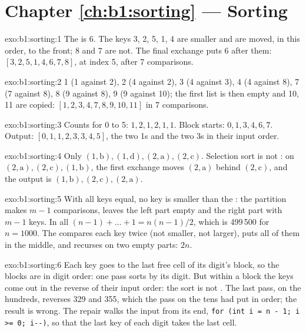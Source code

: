 \section*{Chapter \ref{ch:b1:sorting} --- Sorting}

\begin{solution}{exo:b1:sorting:1}
The  is 6. The keys 3, 2, 5, 1, 4 are smaller and are moved, in this order, to the front; 8 and 7 are not. The
final exchange puts 6 after them: $[3, 2, 5, 1, 4, 6, 7, 8]$,  at index 5, after 7 comparisons.
\end{solution}

\begin{solution}{exo:b1:sorting:2}
1 (1 against 2), 2 (4 against 2), 3 (4 against 3), 4 (4 against 8), 7 (7 against 8), 8 (9 against 8), 9 (9 against 10);
the first list is then empty and 10, 11 are copied: $[1, 2, 3, 4, 7, 8, 9, 10, 11]$ in 7 comparisons.
\end{solution}

\begin{solution}{exo:b1:sorting:3}
Counts for 0 to 5: $1, 2, 1, 2, 1, 1$. Block starts: $0, 1, 3, 4, 6, 7$. Output: $[0, 1, 1, 2, 3, 3, 4, 5]$, the two 1s
and the two 3s in their input order.
\end{solution}

\begin{solution}{exo:b1:sorting:4}
Only $(1, \mathrm{b}), (1, \mathrm{d}), (2, \mathrm{a}), (2, \mathrm{c})$. Selection sort is not : on $(2,
\mathrm{a}), (2, \mathrm{c}), (1, \mathrm{b})$, the first exchange moves $(2, \mathrm{a})$ behind $(2, \mathrm{c})$, and
the output is $(1, \mathrm{b}), (2, \mathrm{c}), (2, \mathrm{a})$.
\end{solution}

\begin{solution}{exo:b1:sorting:5}
With all keys equal, no key is smaller than the : the partition makes $m - 1$ comparisons, leaves the left part
empty and the right part with $m - 1$ keys. In all $(n - 1) + \dots + 1 = n(n - 1)/2$, which is 499\,500 for $n =
1000$. The  compares each key twice (not smaller, not larger), puts all of them in the middle, and
recurses on two empty parts: $2n$.
\end{solution}

\begin{solution}{exo:b1:sorting:6}
Each key goes to the last free cell of its digit's block, so the blocks are in digit order: one pass sorts by its digit.
But within a block the keys come out in the reverse of their input order: the sort is not . The last pass, on the
hundreds, reverses 329 and 355, which the pass on the tens had put in order; the result is wrong. The repair walks the
input from its end, \texttt{for (int i = n - 1; i >= 0; i-{}-)}, so that the last key of each digit takes the last cell.
\end{solution}

